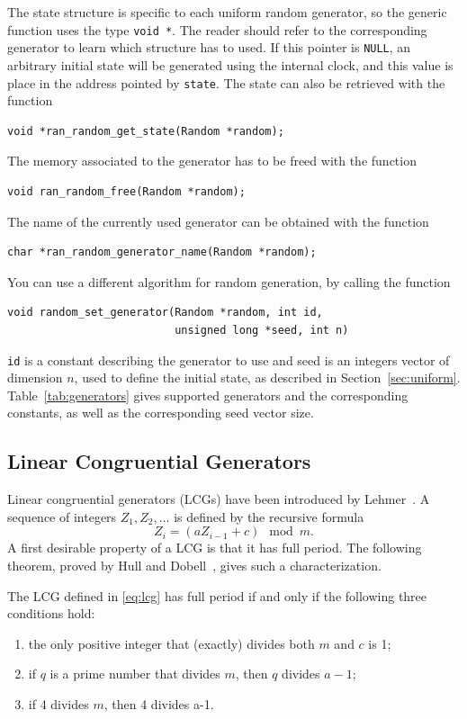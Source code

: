 The state structure is specific to each uniform random generator, so
the generic function uses the type \verb|void *|.
The reader should refer to the corresponding generator to learn which
structure has to used.
If this pointer is \verb|NULL|, an arbitrary initial state will be
generated using the internal clock, and this value is place in the
address pointed by \verb|state|.
The state can also be retrieved with the function
\begin{verbatim}
void *ran_random_get_state(Random *random);
\end{verbatim}

The memory associated to the generator has to be freed with the
function
\begin{verbatim}
void ran_random_free(Random *random);
\end{verbatim}

The name of the currently used generator can be obtained with the
function
\begin{verbatim}
char *ran_random_generator_name(Random *random);
\end{verbatim}
You can use a different algorithm for
random generation, by calling the function
\begin{verbatim}
void random_set_generator(Random *random, int id,
                          unsigned long *seed, int n)
\end{verbatim}
\verb|id| is a constant describing the generator to use and seed is an
integers vector of dimension $n$, used to define the initial state, as
described in Section~\ref{sec:uniform}.
Table~\ref{tab:generators} gives supported generators and the
corresponding constants, as well as the corresponding seed vector size.

\subsection{Linear Congruential Generators}

Linear congruential generators (LCGs) have been introduced by
Lehmer~\cite{Lehm51}.
A sequence of integers $Z_1, Z_2, \ldots$ is defined by the recursive
formula
\begin{equation}
Z_i = (aZ_{i-1}+c) \mod m.
\label{eq:lcg}
\end{equation}
A first desirable property of a LCG is that it has full period.
The following theorem, proved by Hull and Dobell~\cite{HullDobe62}, gives
such a characterization.

\begin{thm}
The LCG defined in \eqref{eq:lcg} has full period if and only if the
following three conditions hold:
\begin{enumerate}
\item
the only positive integer that (exactly) divides both $m$ and $c$ is
1;
\item
if $q$ is a prime number that divides $m$, then $q$ divides $a-1$;
\item
if 4 divides $m$, then 4 divides a-1.
\end{enumerate}
\end{thm}

